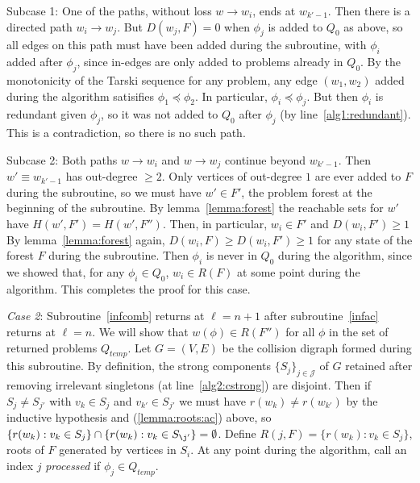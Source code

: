 \documentclass[11pt,reqno]{amsart}
\theoremstyle{definition}
\numberwithin{equation}{section}
\newcommand{\pre}{\phi}
\newcommand{\peq}{\preceq}
\newcommand{\strongcomp}{S}
\newcommand{\acto}{Q_0}
\newcommand{\actt}{Q_{temp}}
\newcommand{\reach}{H}
\newcommand{\forest}{F}
\newcommand{\roott}{R}
\newcommand{\depth}{D}
\begin{document}
Subcase 1: One of the paths, without loss $w \to w_i$, ends at $w_{k'-1}$. 
Then there is a directed path $w_i \to w_j$.
But $\depth(w_j, \forest) = 0$ when $\pre_j$ is added to $\acto$ as above, so all edges on this path must have been added during the subroutine, with $\pre_i$ added after $\pre_j$, since in-edges are only added to problems already in $\acto$. %
By the monotonicity of the Tarski sequence for any problem, any edge $(w_1,w_2)$ added during the algorithm satisifies $\pre_1 \peq \pre_2$. 
In particular, $\pre_i \peq \pre_j$. 
But then $\pre_i$ is redundant given $\pre_j$, so it was not added to $\acto$ after $\pre_j$ (by line~\ref{alg1:redundant}). 
This is a contradiction, so there is no such path.

Subcase 2: Both paths $w \to w_i$ and $w \to w_j$ continue beyond $w_{k'-1}$.
Then $w' \equiv w_{k' - 1}$ has out-degree $\geq 2$.
Only vertices of out-degree $1$ are ever added to $\forest$ during the subroutine, so we must have $w' \in \forest'$, the problem forest at the beginning of the subroutine.
By lemma~\ref{lemma:forest} the reachable sets for $w'$ have $\reach(w',\forest') = \reach(w',\forest'')$.  
Then, in particular, $w_i \in \forest'$ and $\depth(w_i, \forest') \geq 1$
By lemma~\ref{lemma:forest} again, $\depth(w_i, \forest) \geq \depth(w_i, \forest') \geq 1$  for any state of the forest $\forest$ during the subroutine. 
Then $\pre_i$ is never in $\acto$ during the algorithm, since we showed that, for any $\pre_i \in \acto$, $w_i \in \roott(\forest)$ at some point during the algorithm. 
This completes the proof for this case.

\emph{Case 2}: Subroutine~\ref{infcomb} returns at $\ell = n +1$ after subroutine~\ref{infac} returns at $\ell = n$. 
We will show that $w(\pre) \in \roott(\forest'')$ for all $\pre$ in the set of returned problems $\actt$.
Let $G = (V,E)$ be the collision digraph formed during this subroutine.
By definition, the strong components $\{\strongcomp_j\}_{j \in \mathcal{J}}$ of $G$ retained after removing irrelevant singletons (at line~\ref{alg2:cstrong}) are disjoint. 
Then if $\strongcomp_j \not = \strongcomp_{j'}$ with $v_k \in \strongcomp_j$ and $v_{k'} \in \strongcomp_{j'}$ we must have $r(w_k) \not = r(w_{k'})$ by the inductive hypothesis and (\ref{lemma:roots:ac}) above, so $\{r(w_k): v_k \in \strongcomp_j\} \cap \{r(w_k): v_k \in \strongcomp_{\j'}\} = \emptyset$. 
Define $R(j,\forest) = \{r(w_k): v_k \in \strongcomp_j\}$, roots of $\forest$ generated by vertices in $\strongcomp_i$. 
At any point during the algorithm, call an index $j$ \emph{processed} if $\pre_j \in \actt$.
\end{document}

